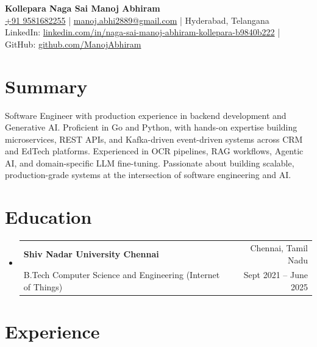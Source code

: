 \documentclass[letterpaper,11pt]{article}
\makeatletter
\newcommand{\resumeSubheading}[4]{
\item
\begin{tabular*}{0.99\textwidth}[t]{l@{\extracolsep{\fill}}r}
\textbf{#1} & #2 \\
#3 & #4 \\
\end{tabular*}
}
\newcommand{\resumeSubHeadingListStart}{
\begin{itemize}[leftmargin=0in,label={},itemsep=2pt,topsep=0pt]
}
\newcommand{\resumeSubHeadingListEnd}{
\end{itemize}
}
\makeatother
\begin{document}

\begin{center}
{\huge \textbf{Kollepara Naga Sai Manoj Abhiram}}\\[2pt]
\small
\href{tel:+919581682255}{+91 9581682255}
\hspace{4pt}|\hspace{4pt}
\href{mailto:manoj.abhi2889@gmail.com}{manoj.abhi2889@gmail.com}
\hspace{4pt}|\hspace{4pt}
Hyderabad, Telangana\\[1pt]
LinkedIn: \href{https://www.linkedin.com/in/naga-sai-manoj-abhiram-kollepara-b9840b222/}{linkedin.com/in/naga-sai-manoj-abhiram-kollepara-b9840b222}
\hspace{4pt}|\hspace{4pt}
GitHub: \href{https://github.com/ManojAbhiram}{github.com/ManojAbhiram}
\end{center}


\section{Summary}
\normalsize{Software Engineer with production experience in backend development and Generative AI. Proficient in Go and Python, with hands-on expertise building microservices, REST APIs, and Kafka-driven event-driven systems across CRM and EdTech platforms. Experienced in OCR pipelines, RAG workflows, Agentic AI, and domain-specific LLM fine-tuning. Passionate about building scalable, production-grade systems at the intersection of software engineering and AI.}


\section{Education}

\resumeSubHeadingListStart

\resumeSubheading
{Shiv Nadar University Chennai}
{Chennai, Tamil Nadu}
{B.Tech Computer Science and Engineering (Internet of Things)}
{Sept 2021 -- June 2025}

\resumeSubHeadingListEnd


\section{Experience}
\end{document}
